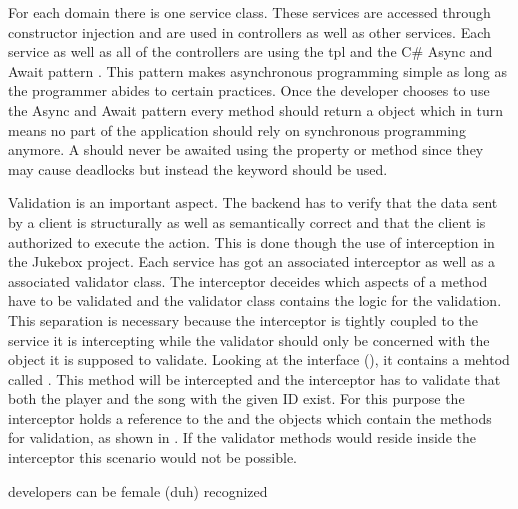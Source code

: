 For each domain there is one service class. These services are accessed through constructor injection and are used in controllers as well as other services. Each service as well as all of the controllers are using the \gls{tpl} and the C\# Async and Await pattern \cite{tpl}. This pattern makes asynchronous programming simple as long as the programmer abides to certain practices. Once the developer chooses to use the Async and Await pattern every method should return a  object which in turn means no part of the application should rely on synchronous programming anymore. A  should never be awaited using the  property or  method since they may cause deadlocks but instead the  keyword should be used.


Validation is an important aspect. The backend has to verify that the data sent by a client is structurally as well as semantically correct and that the client is authorized to execute the action. This is done though the use of interception in the Jukebox project. Each service has got an associated interceptor as well as a associated validator class. The interceptor deceides which aspects of a method have to be validated and the validator class contains the logic for the validation. This separation is necessary because the interceptor is tightly coupled to the service it is intercepting while the validator should only be concerned with the object it is supposed to validate. Looking at the  interface (), it contains a mehtod called . This method will be intercepted and the interceptor has to validate that both the player and the song with the given ID exist. For this purpose the interceptor holds a reference to the  and the  objects which contain the methods for validation, as shown in . If the validator methods would reside inside the interceptor this scenario would not be possible.



developers can be female (duh)
recognized
